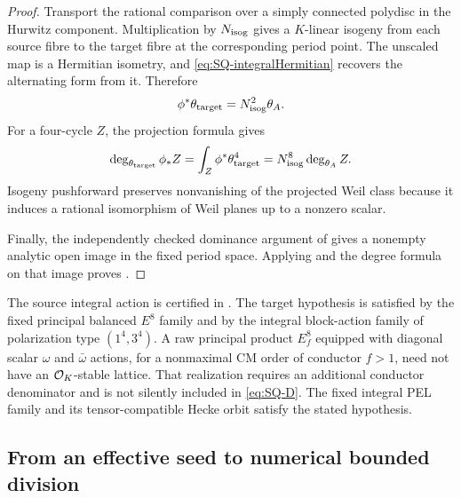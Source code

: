 \begin{proof}
Transport the rational comparison over a simply connected polydisc in the Hurwitz component. Multiplication by $N_{\rm isog}$ gives a $K$-linear isogeny from each source fibre to the target fibre at the corresponding period point. The unscaled map is a Hermitian isometry, and \eqref{eq:SQ-integralHermitian} recovers the alternating form from it. Therefore
\[
 \phi^*\theta_{\rm target}=N_{\rm isog}^{2}\theta_A.
\]
For a four-cycle $Z$, the projection formula gives
\[
 \deg_{\theta_{\rm target}}\phi_*Z
 =\int_Z\phi^*\theta_{\rm target}^4
 =N_{\rm isog}^{8}\deg_{\theta_A}Z.
\]
Isogeny pushforward preserves nonvanishing of the projected Weil class because it induces a rational isomorphism of Weil planes up to a nonzero scalar.

Finally, the independently checked dominance argument of \citet[Section~9, proof of Theorem~A]{Severn26} gives a nonempty analytic open image in the fixed period space. Applying  and the degree formula on that image proves .
\end{proof}

\begin{remark}
The source integral action is certified in . The target hypothesis is satisfied by the fixed principal balanced $E^8$ family and by the integral block-action family of polarization type $(1^4,3^4)$. A raw principal product $E_f^8$ equipped with diagonal scalar $\omega$ and $\bar\omega$ actions, for a nonmaximal CM order of conductor $f>1$, need not have an $\mathcal O_K$-stable lattice. That realization requires an additional conductor denominator and is not silently included in \eqref{eq:SQ-D}. The fixed integral PEL family and its tensor-compatible Hecke orbit satisfy the stated hypothesis.
\end{remark}

\subsection{From an effective seed to numerical bounded division}

